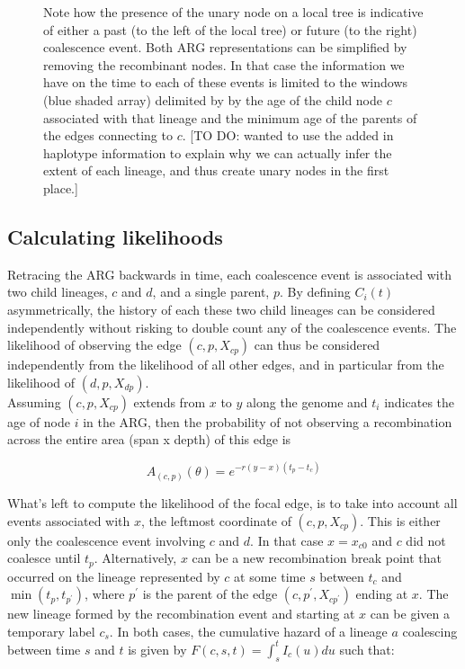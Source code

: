 \documentclass{article}
\begin{document}
\begin{figure}[!ht]
{Note how the presence of the unary node on a local tree is 
indicative of either a past (to the left of the local tree) 
or future (to the right) coalescence event. 
Both ARG representations can be simplified by removing the recombinant nodes. 
In that case the information we have on the time to each of these events is 
limited to the windows (blue shaded array) delimited by by the age of 
the child node $c$ associated with that lineage and the minimum age of 
the parents of the edges connecting to $c$. 
 [TO DO: wanted to use the 
added in haplotype information to explain why we can actually infer the 
extent of each lineage, and thus create unary nodes in the first place.]
}
\label{fig:smc-unary}
\end{figure}



\subsection{Calculating likelihoods} \label{par:liks}

Retracing the ARG backwards in time, each coalescence event is associated with two child 
lineages, $c$ and $d$, and a single parent, $p$. By defining $C_i(t)$ asymmetrically, 
the history of each these two child lineages can be considered independently without 
risking to double count any of the coalescence events. The likelihood of 
observing the edge $(c, p, X_{cp})$ can thus be considered independently from 
the likelihood of all other edges, and in particular from the likelihood 
of $(d, p, X_{dp})$.\\

Assuming $(c, p, X_{cp})$ extends from $x$ to $y$ along the genome and $t_i$ 
indicates the age of 
node $i$ in the ARG, then the probability of not observing a recombination across the 
entire area (span x depth) of this edge is 

\begin{equation}\label{eq:span}
A_{(c, p)}(\theta) = e^{-r (y-x)(t_p - t_{c})}
\end{equation}

What's left to compute the likelihood of the focal edge, is to take into account 
all events associated with $x$, 
the leftmost coordinate of $(c, p, X_{cp})$. 
This is either only the 
coalescence event involving 
$c$ and $d$. In that case $x=x_{c0}$ and $c$ did not coalesce until $t_p$. 
Alternatively, $x$ can be a new recombination break point that 
occurred on the lineage represented by $c$ at some time $s$ between $t_{c}$ 
and $\min(t_p, t_{p^{\prime}})$, where $p^{\prime}$ is the parent of the 
edge $(c, p^{\prime}, X_{cp^{\prime}})$ ending at $x$. The new lineage formed 
by the recombination event and starting at $x$ can be given a temporary label 
$c_s$. In both cases, the cumulative hazard of a lineage $a$ coalescing 
between time $s$ and $t$ is given by $F(c, s, t) = \int_{s}^{t} I_{c}(u)du$ 
such that:
\end{document}
